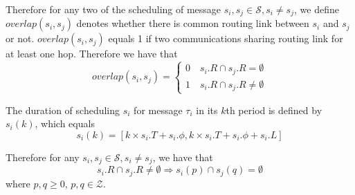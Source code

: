 \documentclass[journal]{IEEEtran}
\newcommand{\calS}{\mathcal{S}}
\begin{document}
Therefore for any two of the scheduling of message 
$s_i,s_j\in\calS,s_i\neq s_j$,
we define 
$ overlap(s_i,s_j)$
 denotes whether there is common routing link between $s_i$ and $s_j$ or not. 
$ overlap(s_i,s_j)$ equals 1 if two communications sharing routing link for at least one hop. 
Therefore we have that
\begin{equation}
\label{e:overlap}
overlap(s_i,s_j)= 
	\begin{cases}
	0 \quad s_i.R \cap s_j.R = \emptyset\\
	1 \quad s_i.R \cap s_j.R \neq \emptyset
\end{cases}
\end{equation}

The duration of scheduling $s_i$ for message $\tau_i$ in its $\mathit{k}$th period is defined by $s_i(k)$, which equals
\begin{equation}
\label{e:duration}
	s_i(k)
	=
	[
	k\times s_i.T+s_i.\phi
	,
	k\times s_i.T+s_i.\phi+s_i.L
	]
\end{equation}

Therefore for any 
$	s_i,s_j \in \calS, s_i \neq s_j	$,
we have that
\begin{equation}
	s_i.R \cap s_j.R \neq \emptyset
	\Longrightarrow
	s_i(p) \cap s_j(q) = \emptyset
\end{equation}
where $p,q\geq 0$, $p,q\in\mathcal{Z}$.
\end{document}

